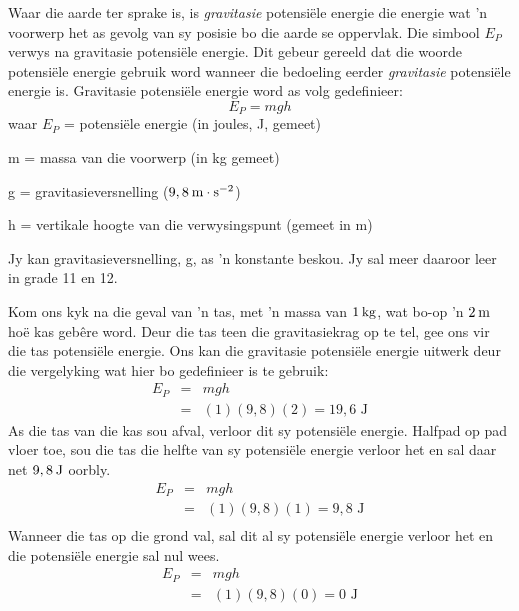       \label{m38784*id66167}Waar die aarde ter sprake is, is \textsl{gravitasie} potensi\"{e}le energie die energie wat   'n voorwerp het as gevolg van sy posisie bo die aarde se oppervlak. Die simbool ${E}_{P}$ verwys na gravitasie potensiële energie. Dit gebeur gereeld dat die woorde potensiële energie gebruik word wanneer die bedoeling eerder \textsl{gravitasie} potensiële energie is. Gravitasie potensi\"{e}le energie word as volg gedefinieer:\\
      \label{m38784*uid45}\nopagebreak\noindent{}
    \begin{equation}
    {E}_{P}=mgh
      \end{equation}
      \label{m38784*id66223}waar
${E}_{P}$ = potensi\"{e}le energie (in joules, J, gemeet)\par 
      \label{m38784*id66229}m = massa van die voorwerp (in kg gemeet)\par 
      \label{m38784*id66234}g = gravitasieversnelling ($9,8\phantom{\rule{2pt}{0ex}}\text{m}\ensuremath{\cdot}\text{s}{}^{-2}$)\par 
      \label{m38784*id66266}h = vertikale hoogte van die verwysingspunt (gemeet in m)\par 
      \label{m38784*eip-306}

Jy kan gravitasieversnelling, g, as   'n konstante beskou. Jy sal meer daaroor leer in grade 11 en 12. 


Kom ons kyk na die geval van   'n tas, met   'n massa van $1\phantom{\rule{2pt}{0ex}}\text{kg}$, wat bo-op   'n $2\phantom{\rule{2pt}{0ex}}\text{m}$ ho\"{e} kas geb\^{e}re word. Deur die tas teen die gravitasiekrag op te tel, gee ons vir die tas potensi\"{e}le energie. Ons kan die gravitasie potensi\"{e}le energie uitwerk deur die vergelyking wat hier bo gedefinieer is te gebruik:
\begin{eqnarray*}
E_{P} & = & mgh \\
& = & (1)(9,8)(2) = 19,6 \text{ J}
\end{eqnarray*}
As die tas van die kas sou afval, verloor dit sy potensiële energie. Halfpad op pad vloer toe, sou die tas die helfte van sy potensiële energie verloor het en sal daar net $9,8\phantom{\rule{2pt}{0ex}}\text{J}$ oorbly. 
\begin{eqnarray*}
E_{P} & = & mgh \\
& = & (1)(9,8)(1) = 9,8 \text{ J} \\
\end{eqnarray*}
Wanneer die tas op die grond val, sal dit al sy potensi\"{e}le energie verloor het en die potensi\"{e}le energie sal nul wees.
\begin{eqnarray*}
E_{P} & = & mgh \\
& = & (1)(9,8)(0) = 0 \text{ J} \\
\end{eqnarray*}

